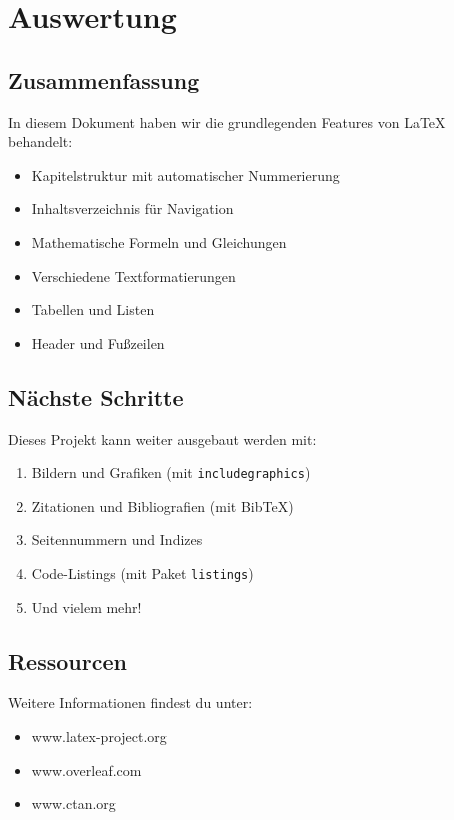 \chapter{Auswertung}

\section{Zusammenfassung}

In diesem Dokument haben wir die grundlegenden Features von \LaTeX{} behandelt:

\begin{itemize}
    \item Kapitelstruktur mit automatischer Nummerierung
    \item Inhaltsverzeichnis für Navigation
    \item Mathematische Formeln und Gleichungen
    \item Verschiedene Textformatierungen
    \item Tabellen und Listen
    \item Header und Fußzeilen
\end{itemize}

\section{Nächste Schritte}

Dieses Projekt kann weiter ausgebaut werden mit:

\begin{enumerate}
    \item Bildern und Grafiken (mit \texttt{includegraphics})
    \item Zitationen und Bibliografien (mit Bib\TeX{})
    \item Seitennummern und Indizes
    \item Code-Listings (mit Paket \texttt{listings})
    \item Und vielem mehr!
\end{enumerate}

\section{Ressourcen}

Weitere Informationen findest du unter:
\begin{itemize}
    \item www.latex-project.org
    \item www.overleaf.com
    \item www.ctan.org
\end{itemize}
